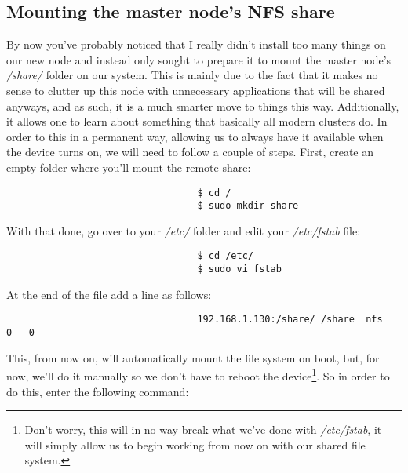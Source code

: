 \documentclass[]{article}
\begin{document}
                                  \subsection{Mounting the master node's NFS share}
                                  By now you've probably noticed that I really didn't install too many things on our new node and instead only sought to prepare it to 
                                  mount the master node's \textit{/share/} folder on our system. This is mainly due to the fact that it makes no sense to clutter up this
                                  node with unnecessary applications that will be shared anyways, and as such, it is a much smarter move to things this way. 
                                  Additionally, it allows one to learn about something that basically all modern clusters do. In order to this in a permanent way, 
                                  allowing us to always have it available when the device turns on, we will need to follow a couple of steps. First, create an empty 
                                  folder where you'll mount the remote share:
                                  \begin{lstlisting}
                                  $ cd /
                                  $ sudo mkdir share
                                  \end{lstlisting}
                                  With that done, go over to your \textit{/etc/} folder and edit your \textit{/etc/fstab} file:
                                  \begin{lstlisting}
                                  $ cd /etc/
                                  $ sudo vi fstab
                                  \end{lstlisting}
                                  At the end of the file add a line as follows:
                                  \begin{lstlisting}
                                  192.168.1.130:/share/ /share  nfs     0   0
                                  \end{lstlisting}
                                  This, from now on, will automatically mount the file system on boot, but, for now, we'll do it manually so we don't have to reboot the 
                                  device\footnote{Don't worry, this will in no way break what we've done with \textit{/etc/fstab}, it will simply allow us to begin 
                                      working from now on with our shared file system.}. So in order to do this, enter the following command:
\end{document}
